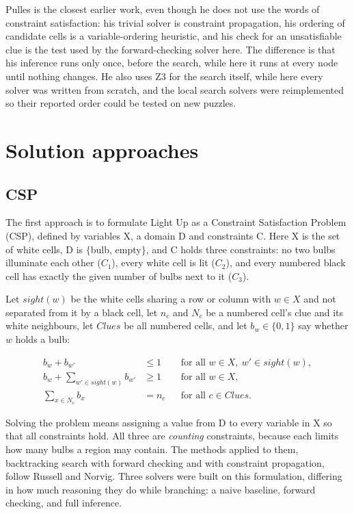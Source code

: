 \documentclass[12pt]{report}
\begin{document}
Pulles is the closest earlier work, even though he does not use the words of constraint satisfaction: his trivial solver is constraint propagation, his ordering of candidate cells is a variable-ordering heuristic, and his check for an unsatisfiable clue is the test used by the forward-checking solver here. The difference is that his inference runs only once, before the search, while here it runs at every node until nothing changes. He also uses Z3 for the search itself, while here every solver was written from scratch, and the local search solvers were reimplemented so their reported order could be tested on new puzzles.


\chapter{Solution approaches}

\section{CSP}
The first approach is to formulate Light Up as a Constraint Satisfaction Problem (CSP), defined by variables X, a domain D and constraints C. Here X is the set of white cells, D is $\{$bulb, empty$\}$, and C holds three constraints: no two bulbs illuminate each other ($C_1$), every white cell is lit ($C_2$), and every numbered black cell has exactly the given number of bulbs next to it ($C_3$).

Let $\mathit{sight}(w)$ be the white cells sharing a row or column with $w \in X$ and not separated from it by a black cell, let $n_c$ and $N_c$ be a numbered cell's clue and its white neighbours, let $\mathit{Clues}$ be all numbered cells, and let $b_w \in \{0,1\}$ say whether $w$ holds a bulb:

\begin{align}
  b_w + b_{w'} &\le 1 && \text{for all } w \in X,\ w' \in \mathit{sight}(w),
    \tag{$C_1$} \\[2pt]
  b_w + \sum_{w' \in \mathit{sight}(w)} b_{w'} &\ge 1 && \text{for all } w \in X,
    \tag{$C_2$} \\[2pt]
  \sum_{x \in N_c} b_x &= n_c && \text{for all } c \in \mathit{Clues}.
    \tag{$C_3$}
\end{align}

Solving the problem means assigning a value from D to every variable in X so that all constraints hold. All three are \emph{counting} constraints, because each limits how many bulbs a region may contain. The methods applied to them, backtracking search with forward checking and with constraint propagation, follow Russell and Norvig\cite{aima}. Three solvers were built on this formulation, differing in how much reasoning they do while branching: a naive baseline, forward checking, and full inference.
\end{document}
